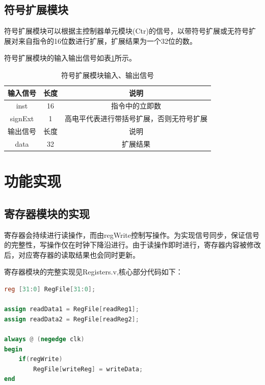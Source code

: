 \documentclass[UTF8]{ctexart}
\begin{document}
\subsection{符号扩展模块}
符号扩展模块可以根据主控制器单元模块(Ctr)的信号，以带符号扩展或无符号扩展对来自指令的16位数进行扩展，扩展结果为一个32位的数。\par
符号扩展模块的输入输出信号如表\ref{tab:signext-input-output-sig}所示。
\begin{table}[htbp]
    \centering
    \begin{tabular}{|c|c|c|}
    \hline
    输入信号 & 长度 & 说明 \\ 
    \hline
    inst & 16 & 指令中的立即数 \\
    signExt & 1 & 高电平代表进行带括号扩展，否则无符号扩展 \\
    \hline
    \hline
    输出信号 & 长度 & 说明 \\ 
    \hline
    data & 32 & 扩展结果\\
    \hline
    \end{tabular}
    \caption{符号扩展模块输入、输出信号}
    \label{tab:signext-input-output-sig}
    \end{table}

\section{功能实现}\label{sec2}
\subsection{寄存器模块的实现}
寄存器会持续进行读操作，而由regWrite控制写操作。为实现信号同步，保证信号的完整性，写操作仅在时钟下降沿进行。由于读操作即时进行，寄存器内容被修改后，对应寄存器的读取结果也会同时更新。\par
寄存器模块的完整实现见Registers.v,核心部分代码如下：
\begin{lstlisting}[language=verilog]
reg [31:0] RegFile[31:0];

assign readData1 = RegFile[readReg1];
assign readData2 = RegFile[readReg2];

always @ (negedge clk)
begin
    if(regWrite)
        RegFile[writeReg] = writeData; 
end
\end{lstlisting}
\end{document}
